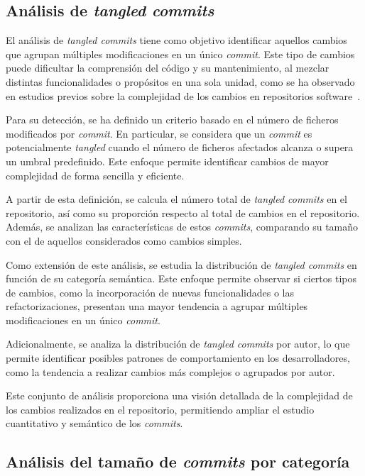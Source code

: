 \documentclass[a4paper, 12pt]{book}
\begin{document}
\subsection{Análisis de \emph{tangled commits}}
\label{subsec:tangled}

El análisis de \emph{tangled commits} tiene como objetivo identificar aquellos cambios que agrupan múltiples modificaciones en un único \emph{commit}. Este tipo de cambios puede dificultar la comprensión del código y su mantenimiento, al mezclar distintas funcionalidades o propósitos en una sola unidad, como se ha observado en estudios previos sobre la complejidad de los cambios en repositorios software~\cite{herzig2013impact}.

Para su detección, se ha definido un criterio basado en el número de ficheros modificados por \emph{commit}. En particular, se considera que un \emph{commit} es potencialmente \emph{tangled} cuando el número de ficheros afectados alcanza o supera un umbral predefinido. Este enfoque permite identificar cambios de mayor complejidad de forma sencilla y eficiente.

A partir de esta definición, se calcula el número total de \emph{tangled commits} en el repositorio, así como su proporción respecto al total de cambios en el repositorio. Además, se analizan las características de estos \emph{commits}, comparando su tamaño con el de aquellos considerados como cambios simples.

Como extensión de este análisis, se estudia la distribución de \emph{tangled commits} en función de su categoría semántica. Este enfoque permite observar si ciertos tipos de cambios, como la incorporación de nuevas funcionalidades o las refactorizaciones, presentan una mayor tendencia a agrupar múltiples modificaciones en un único \emph{commit}.

Adicionalmente, se analiza la distribución de \emph{tangled commits} por autor, lo que permite identificar posibles patrones de comportamiento en los desarrolladores, como la tendencia a realizar cambios más complejos o agrupados por autor.

Este conjunto de análisis proporciona una visión detallada de la complejidad de los cambios realizados en el repositorio, permitiendo ampliar el estudio cuantitativo y semántico de los \emph{commits}.

\subsection{Análisis del tamaño de \emph{commits} por categoría}
\label{subsec:rq6}
\end{document}
